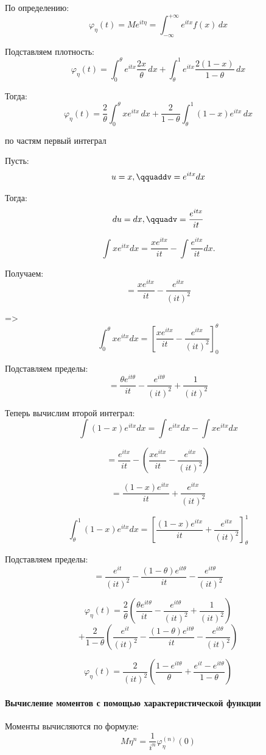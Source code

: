 \documentclass[12pt,a4paper]{article}
\theoremstyle{definition}
\begin{document}
По определению:
\[\varphi_\eta(t)=
Me^{it\eta}=\int_{-\infty}^{+\infty}e^{itx}f(x)\,dx\]

Подставляем плотность:
\[\varphi_\eta(t)=
\int_0^\theta
e^{itx}\frac{2x}{\theta}\,dx
+
\int_\theta^1
e^{itx}\frac{2(1-x)}{1-\theta}\,dx\]

Тогда:
\[\varphi_\eta(t)=
\frac2\theta\int_0^\theta
xe^{itx}\,dx
+
\frac2{1-\theta}\int_\theta^1(1-x)e^{itx}\,dx\]

по частям первый интеграл

Пусть:
\[u=x,\qquaddv=e^{itx}dx\]

Тогда:
\[du=dx,\qquadv=\frac{e^{itx}}{it}\]

\[\int xe^{itx}dx=
\frac{xe^{itx}}{it}
-
\int\frac{e^{itx}}{it}dx.\]

Получаем:
\[=\frac{xe^{itx}}{it}
-
\frac{e^{itx}}{(it)^2}\]

=>
\[
\int_0^\theta xe^{itx}dx
=\left[\frac{xe^{itx}}{it}
-
\frac{e^{itx}}{(it)^2}\right]_0^\theta\]

Подставляем пределы:
\[=\frac{\theta e^{it\theta}}{it}
-
\frac{e^{it\theta}}{(it)^2}
+\frac1{(it)^2}\]

Теперь вычислим второй интеграл:
\[\int(1-x)e^{itx}dx
=
\int e^{itx}dx
-
\int xe^{itx}dx\]

\[=
\frac{e^{itx}}{it}
-
\left(\frac{xe^{itx}}{it}
-
\frac{e^{itx}}{(it)^2}\right)\]

\[=\frac{(1-x)e^{itx}}{it}
+
\frac{e^{itx}}{(it)^2}\]

\[\int_\theta^1(1-x)e^{itx}dx
=\left[
\frac{(1-x)e^{itx}}{it}
+
\frac{e^{itx}}{(it)^2}\right]_\theta^1\]

Подставляем пределы:
\[=\frac{e^{it}}{(it)^2}
-
\frac{(1-\theta)e^{it\theta}}{it}
-
\frac{e^{it\theta}}{(it)^2}\]

\[\varphi_\eta(t)
=
\frac2\theta\left(\frac{\theta e^{it\theta}}{it}
-
\frac{e^{it\theta}}{(it)^2}
+
\frac1{(it)^2}\right)\]
\[+\frac2{1-\theta}
\left(\frac{e^{it}}{(it)^2}
-
\frac{(1-\theta)e^{it\theta}}{it}
-
\frac{e^{it\theta}}{(it)^2}\right)\]

\[\boxed{\varphi_\eta(t)
=
\frac2{(it)^2}\left(
\frac{1-e^{it\theta}}{\theta}
+
\frac{e^{it}-e^{it\theta}}{1-\theta}\right)}\]

\paragraph{Вычисление моментов с помощью характеристической функции}

Моменты вычисляются по формуле:
\[M\eta^n=\frac1{i^n}\varphi_\eta^{(n)}(0)\]
\end{document}
